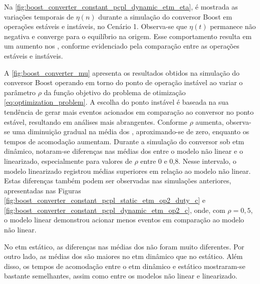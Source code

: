 Na \autoref{fig:boost_converter_constant_pcpl_dynamic_etm_eta}, é mostrada as variações temporais de $\eta(n)$ durante a simulação do conversor Boost em operações estáveis e instáveis, no Cenário 1. Observa-se que $\eta(t)$ permanece não negativa e converge para o equilíbrio na origem. Esse comportamento resulta em um aumento nos , conforme evidenciado pela comparação entre as operações estáveis e instáveis.

A \autoref{fig:boost_converter_mu} apresenta os resultados obtidos na simulação do conversor Boost operando em torno do ponto de operação instável ao variar o parâmetro $\rho$ da função objetivo do problema de otimização \eqref{eq:optimization_problem}. A escolha do ponto instável é baseada na sua tendência de gerar mais eventos acionados em comparação ao conversor no ponto estável, resultando em análises mais abrangentes.  Conforme $\rho$ aumenta, observa-se uma diminuição gradual na média dos , aproximando-se de zero, enquanto os tempos de acomodação aumentam. Durante a simulação do conversor sob \acrshort{etm} dinâmico, notaram-se diferenças nas médias dos  entre o modelo não linear e o linearizado, especialmente para valores de $\rho$ entre 0 e 0,8. Nesse intervalo, o modelo linearizado registrou médias superiores em relação ao modelo não linear. Estas diferenças também podem ser observadas nas simulações anteriores, apresentadas nas Figuras \ref{fig:boost_converter_constant_pcpl_static_etm_op2_duty_c} e \ref{fig:boost_converter_constant_pcpl_dynamic_etm_op2_c}, onde, com $\rho = 0,5$, o modelo linear demonstrou acionar menos eventos em comparação ao modelo não linear. 

No \acrshort{etm} estático, as diferenças nas médias dos  não foram muito diferentes. Por outro lado, as médias dos  são maiores no \acrshort{etm} dinâmico que no estático. Além disso, os tempos de acomodação entre o \acrshort{etm} dinâmico e estático mostraram-se bastante semelhantes, assim como entre os modelos não linear e linearizado.


